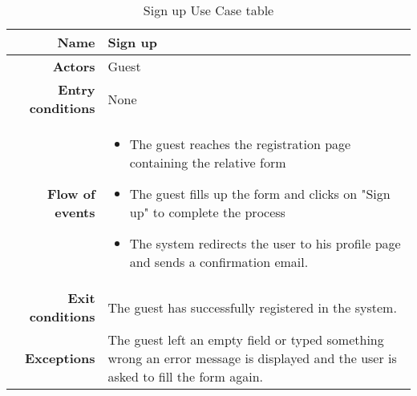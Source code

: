 
\begin{table}[htp]

\begin{tabular}{r|p{7cm}}
\bf\large Name&\bf\large Sign up\\
\hline
\hline
\bf Actors&Guest\\
\hline
\bf Entry conditions&None\\
\hline
\bf Flow of events&
\begin{itemize}
\item The guest reaches the registration page containing the relative form
\item The guest fills up the form and clicks on "Sign up" to complete the process
\item The system redirects the user to his profile page and sends a confirmation email.
\end{itemize}
\\
\hline
\bf Exit conditions&The guest has successfully registered in the system. \\
\hline
\bf Exceptions&The guest left an empty field or typed
 something wrong an error message is displayed 
 and the user is asked to fill the form again.\\
\hline

\end{tabular}
\caption{Sign up Use Case table} \label{tab:signup}
\end{table}
